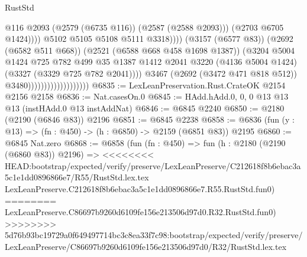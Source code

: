 \begin{lexlean}{RustStd}
\begin{coremodule}
{\begin{coremodule}
{{{{{{{{{{                                                            @116
                                                            @2093
                                                            (@2579 (@6735 @116))
                                                            (@2587 (@2588 @2093)))
                                                          (@2703 @6705 @1424))))
                                                    @5102
                                                    @5105
                                                    @5108
                                                    @5111
                                                    @3318))))
                                            (@3157 (@6577 @83))
                                            (@2692 (@6582 @511 @668))
                                            (@2521 (@6588 @668 @458 @1698 @1387))
                                            (@3204
                                              @5004
                                              @1424
                                              @725
                                              @782
                                              @499
                                              @35
                                              @1387
                                              @1412
                                              @2041
                                              @3220
                                              (@4136 @5004 @1424)
                                              (@3327 (@3329 @725 @782 @2041))))
                                          @3467
                                          (@2692 (@3472 @471 @818 @512))
                                          @3480)))))))))))))))))))
@6835 := LexLeanPreservation.Rust.CrateOK @2154 @2156 @2158
@6836 := Nat.casesOn.{0}
@6845 := HAdd.hAdd.{0, 0, 0} @13 @13 @13 (instHAdd.{0} @13 instAddNat)
@6846 := @6845 @2240
@6850 := @2180 (@2190 (@6846 @83)) @2196
@6851 := @6845 @2238
@6858 := @6836 (fun (y : @13) => (fn : @450) -> (h : @6850) -> @2159 (@6851 @83)) @2195
@6860 := @6845 Nat.zero
@6868 := @6858
    (fun (fn : @450) =>
    fun (h : @2180 (@2190 (@6860 @83)) @2196) =>
<<<<<<<< HEAD:bootstrap/expected/verify/preserve/LexLeanPreserve/C212618f8b6ebac3a5c1e1dd0896866e7/R55/RustStd.lex.tex
    LexLeanPreserve.C212618f8b6ebac3a5c1e1dd0896866e7.R55.RustStd.fun0)
========
    LexLeanPreserve.C86697b9260d6109fe156e213506d97d0.R32.RustStd.fun0)
>>>>>>>> 5d76b93bc19729a0f649497714bc3c8ea33f7c98:bootstrap/expected/verify/preserve/LexLeanPreserve/C86697b9260d6109fe156e213506d97d0/R32/RustStd.lex.tex
}}}}}}}}}}
\end{coremodule}}
\end{coremodule}
\end{lexlean}
